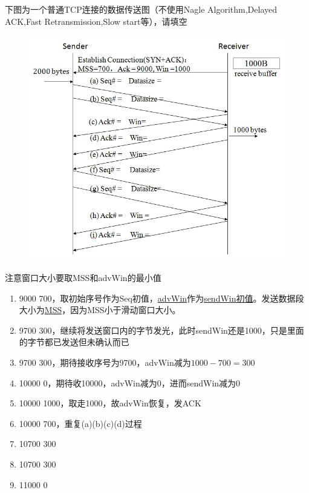 \begin{example}
    下图为一个普通TCP连接的数据传送图（不使用Nagle Algorithm,Delayed ACK,Fast Retransmission,Slow start等），请填空
    \begin{figure}[H]
        \centering
        \includegraphics[width=0.5\linewidth]{fig/tcp_example.jpg}
    \end{figure}
\end{example}
\begin{analysis}
    注意窗口大小要取MSS和advWin的最小值
    \begin{enumerate}[label=(\alph*)]
        \item 9000 700，取初始序号作为Seq初值，\underline{advWin}作为\underline{sendWin初值}。发送数据段大小为\underline{MSS}，因为MSS小于滑动窗口大小。
        \item 9700 300，继续将发送窗口内的字节发光，此时sendWin还是1000，只是里面的字节都已发送但未确认而已
        \item 9700 300，期待接收序号为9700，advWin减为$1000-700=300$
        \item 10000 0，期待收10000，advWin减为0，进而sendWin减为0
        \item 10000 1000，取走1000，故advWin恢复，发ACK
        \item 10000 700，重复(a)(b)(c)(d)过程
        \item 10700 300
        \item 10700 300
        \item 11000 0
    \end{enumerate}
\end{analysis}

